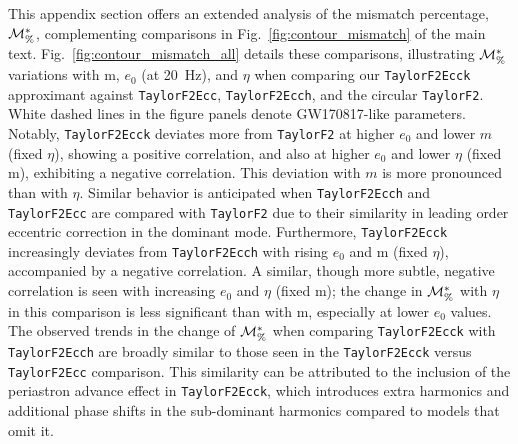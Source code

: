 \documentclass[aps,prd,twocolumn,superscriptaddress,groupedaddress,nofootinbib,showpacs,eqsecnum,useAms]{revtex4-2}
\begin{document}
This appendix section offers an extended analysis of the mismatch percentage, ${\cal M}^*_{\%}$, complementing comparisons in Fig.~\ref{fig:contour_mismatch} of the main text. Fig.~\ref{fig:contour_mismatch_all} details these comparisons, illustrating ${\cal M}^*_{\%}$ variations with m, $e_0$ (at 20~Hz), and $\eta$ when comparing our \texttt{TaylorF2Ecck} approximant against \texttt{TaylorF2Ecc}, \texttt{TaylorF2Ecch}, and the circular \texttt{TaylorF2}. White dashed lines in the figure panels denote GW170817-like parameters. Notably, \texttt{TaylorF2Ecck} deviates more from \texttt{TaylorF2} at higher $e_0$ and lower $m$ (fixed $\eta$), showing a positive correlation, and also at higher $e_0$ and lower $\eta$ (fixed m), exhibiting a negative correlation. This deviation with $m$ is more pronounced than with $\eta$. Similar behavior is anticipated when \texttt{TaylorF2Ecch} and \texttt{TaylorF2Ecc} are compared with \texttt{TaylorF2} due to their similarity in leading order eccentric correction in the dominant mode. Furthermore, \texttt{TaylorF2Ecck} increasingly deviates from \texttt{TaylorF2Ecch} with rising $e_0$ and m (fixed $\eta$), accompanied by a negative correlation. 
A similar, though more subtle, negative correlation is seen with increasing $e_0$ and $\eta$ (fixed m); the change in ${\cal M}^*_{\%}$ with $\eta$ in this comparison is less significant than with m, especially at lower $e_0$ values. The observed trends in the change of ${\cal M}^*_{\%}$ when comparing \texttt{TaylorF2Ecck} with \texttt{TaylorF2Ecch} are broadly similar to those seen in the \texttt{TaylorF2Ecck} versus \texttt{TaylorF2Ecc} comparison. This similarity can be attributed to the inclusion of the periastron advance effect in \texttt{TaylorF2Ecck}, which introduces extra harmonics and additional phase shifts in the sub-dominant harmonics compared to models that omit it.
\end{document}
